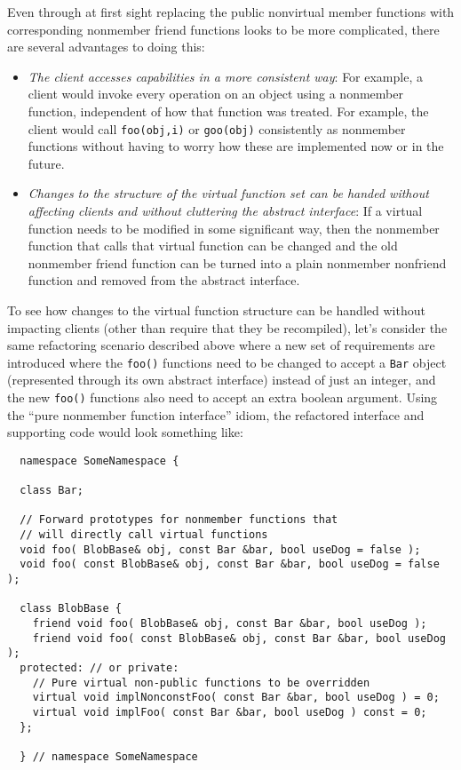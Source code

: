\documentclass[pdf,ps2pdf,11pt]{SANDreport}
\begin{document}
Even through at first sight replacing the public nonvirtual member functions
with corresponding nonmember friend functions looks to be more complicated,
there are several advantages to doing this:

\begin{itemize}

{}\item\textit{The client accesses capabilities in a more consistent way}: For
example, a client would invoke every operation on an object using a nonmember
function, independent of how that function was treated.  For example, the
client would call {}\texttt{foo(obj,i)} or {}\texttt{goo(obj)} consistently as
nonmember functions without having to worry how these are implemented now or
in the future.

{}\item\textit{Changes to the structure of the virtual function set can be
handed without affecting clients and without cluttering the abstract
interface}: If a virtual function needs to be modified in some significant
way, then the nonmember function that calls that virtual function can be
changed and the old nonmember friend function can be turned into a plain
nonmember nonfriend function and removed from the abstract interface.

\end{itemize}

To see how changes to the virtual function structure can be handled without
impacting clients (other than require that they be recompiled), let's consider
the same refactoring scenario described above where a new set of requirements
are introduced where the {}\texttt{foo()} functions need to be changed to
accept a {}\texttt{Bar} object (represented through its own abstract
interface) instead of just an integer, and the new {}\texttt{foo()} functions
also need to accept an extra boolean argument.  Using the ``pure nonmember
function interface'' idiom, the refactored interface and supporting code would
look something like:

{\small\begin{verbatim}
  namespace SomeNamespace {

  class Bar;

  // Forward prototypes for nonmember functions that
  // will directly call virtual functions
  void foo( BlobBase& obj, const Bar &bar, bool useDog = false );
  void foo( const BlobBase& obj, const Bar &bar, bool useDog = false );

  class BlobBase {
    friend void foo( BlobBase& obj, const Bar &bar, bool useDog );
    friend void foo( const BlobBase& obj, const Bar &bar, bool useDog );
  protected: // or private:
    // Pure virtual non-public functions to be overridden
    virtual void implNonconstFoo( const Bar &bar, bool useDog ) = 0;
    virtual void implFoo( const Bar &bar, bool useDog ) const = 0;
  };

  } // namespace SomeNamespace
\end{verbatim}}
\end{document}

